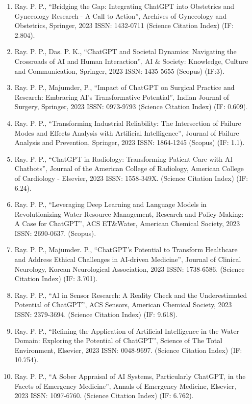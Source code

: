\documentclass[11pt,a4paper]{moderncv}
\begin{document}
\begin{adjustwidth}{6em}{0pt}
\begin{enumerate}
		\item Ray. P. P., “Bridging the Gap: Integrating ChatGPT into Obstetrics and Gynecology Research - A Call to Action”, Archives of Gynecology and Obstetrics, Springer, 2023 ISSN: 1432-0711 (Science Citation Index) (IF: 2.804).
		\item Ray. P. P., Das. P. K., “ChatGPT and Societal Dynamics: Navigating the Crossroads of AI and Human Interaction”, AI \& Society: Knowledge, Culture and Communication, Springer, 2023 ISSN: 1435-5655 (Scopus) (IF:3).
		\item Ray. P. P., Majumder, P., “Impact of ChatGPT on Surgical Practice and Research: Embracing AI's Transformative Potential”, Indian Journal of Surgery, Springer, 2023 ISSN: 0973-9793 (Science Citation Index) (IF: 0.609).
		\item Ray. P. P., “Transforming Industrial Reliability: The Intersection of Failure Modes and Effects Analysis with Artificial Intelligence”, Journal of Failure Analysis and Prevention, Springer, 2023 ISSN: 1864-1245 (Scopus) (IF: 1.1).
		\item Ray. P. P., “ChatGPT in Radiology: Transforming Patient Care with AI Chatbots”, Journal of the American College of Radiology, American College of Cardiology - Elsevier, 2023 ISSN: 1558-349X. (Science Citation Index) (IF: 6.24).
		\item Ray. P. P., “Leveraging Deep Learning and Language Models in Revolutionizing Water Resource Management, Research and Policy-Making: A Case for ChatGPT”, ACS ET\&Water, American Chemical Society, 2023 ISSN: 2690-0637. (Scopus).
		\item Ray. P. P., Majumder. P., “ChatGPT's Potential to Transform Healthcare and Address Ethical Challenges in AI-driven Medicine”, Journal of Clinical Neurology, Korean Neurological Association, 2023 ISSN: 1738-6586. (Science Citation Index) (IF: 3.701).
		\item Ray. P. P., “AI in Sensor Research: A Reality Check and the Underestimated Potential of ChatGPT”, ACS Sensors, American Chemical Society, 2023 ISSN: 2379-3694. (Science Citation Index) (IF: 9.618).
		\item Ray. P. P., “Refining the Application of Artificial Intelligence in the Water Domain: Exploring the Potential of ChatGPT”, Science of The Total Environment, Elsevier, 2023 ISSN: 0048-9697. (Science Citation Index) (IF: 10.754).
		\item Ray. P. P., “A Sober Appraisal of AI Systems, Particularly ChatGPT, in the Facets of Emergency Medicine”, Annals of Emergency Medicine, Elsevier, 2023 ISSN: 1097-6760. (Science Citation Index) (IF: 6.762).

\end{enumerate}
\end{adjustwidth}
\end{document}
